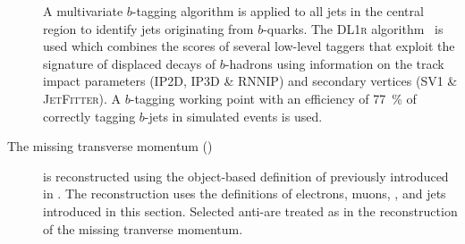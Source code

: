\begin{description}
  A multivariate $b$-tagging algorithm is applied to all jets in the central
  region to identify jets originating from $b$-quarks.
  The \textsc{DL1r} algorithm~\cite{FTAG-2019-07} is used which combines the
  scores of several low-level taggers that exploit the signature of displaced
  decays of $b$-hadrons using information on the track impact parameters
  (\textsc{IP2D}, \textsc{IP3D} \& \textsc{RNNIP}) and secondary vertices
  (\textsc{SV1} \& \textsc{JetFitter}). A $b$-tagging working point with an
  efficiency of \SI{77}{\percent} of correctly tagging $b$-jets in simulated
  \ttbar events is used.

\item[The missing transverse momentum (\pTmiss)] is reconstructed using the
  object-based definition of \pTmiss previously introduced in
  . The \pTmiss reconstruction uses the definitions of
  electrons, muons, \tauhadvis, and jets introduced in this section. Selected
  anti-\tauhadvis are treated as \tauhadvis in the reconstruction of the missing
  tranverse momentum.



\end{description}


